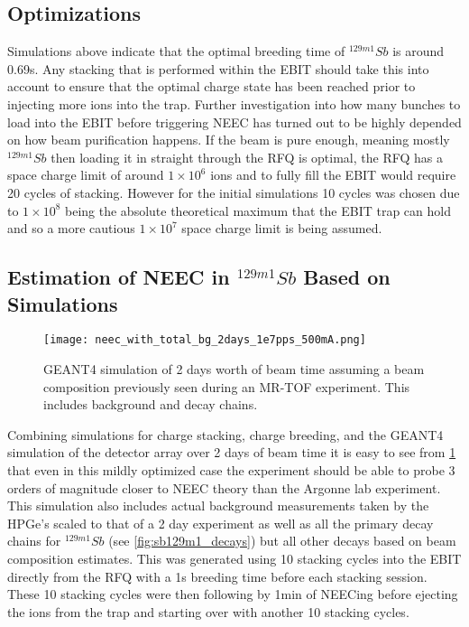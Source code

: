 \documentclass[jon_ringuette_thesis_proposal.tex]{subfiles}
\begin{document}
    \subsection{Optimizations}\label{subsec:optimizations}

    Simulations above indicate that the optimal breeding time of $^{129m1}Sb$ is around 0.69s.
    Any stacking that is performed within the EBIT should take this into account to ensure that the optimal charge state has been reached prior to injecting more ions into the trap.
    Further investigation into how many bunches to load into the EBIT before triggering NEEC has turned out to be highly depended on how beam purification happens.
    If the beam is pure enough, meaning mostly $^{129m1}Sb$ then loading it in straight through the RFQ is optimal, the RFQ has a space charge limit of around $1\times 10^6$ ions and to fully fill the EBIT would require 20 cycles of stacking.
    However for the initial simulations 10 cycles was chosen due to $1\times 10^8$ being the absolute theoretical maximum that the EBIT trap can hold and so a more cautious $1 \times 10^7$ space charge limit is being assumed.

    \subsection{Estimation of NEEC in $^{129m1}Sb$ Based on Simulations}
    \begin{figure}[H]
        \begin{center}
            \texttt{[image: neec\_with\_total\_bg\_2days\_1e7pps\_500mA.png]}
        \end{center}
        \caption{\small GEANT4 simulation of 2 days worth of beam time assuming a beam composition previously seen during an MR-TOF experiment. This includes background and decay chains.}
        \label{fig:neec_2day_500ma_simulation}
    \end{figure}

    Combining simulations for charge stacking, charge breeding, and the GEANT4 simulation of the detector array over 2 days of beam time it is easy to see from \ref{fig:neec_2day_500ma_simulation} that even in this mildly optimized case the experiment should be able to probe 3 orders of magnitude closer to NEEC theory than the Argonne lab experiment.
    This simulation also includes actual background measurements taken by the HPGe's scaled to that of a 2 day experiment as well as all the primary decay chains for $^{129m1}Sb$ (see \ref{fig:sb129m1_decays}) but all other decays based on beam composition estimates.
    This was generated using 10 stacking cycles into the EBIT directly from the RFQ with a 1s breeding time before each stacking session.
    These 10 stacking cycles were then following by 1min of NEECing before ejecting the ions from the trap and starting over with another 10 stacking cycles.
\end{document}
